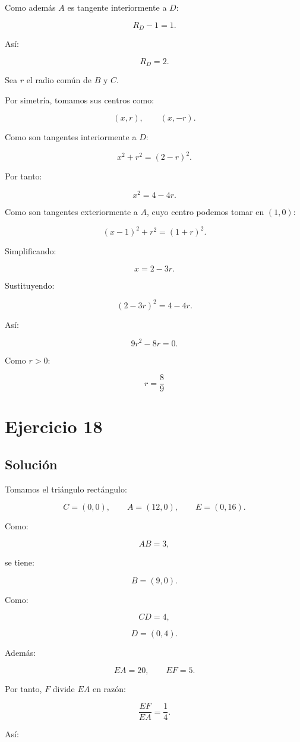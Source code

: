 \documentclass[11pt,a4paper]{article}
\begin{document}
Como además \(A\) es tangente interiormente a \(D\):

\[
R_D-1=1.
\]

Así:

\[
R_D=2.
\]

Sea \(r\) el radio común de \(B\) y \(C\).

Por simetría, tomamos sus centros como:

\[
(x,r),
\qquad
(x,-r).
\]

Como son tangentes interiormente a \(D\):

\[
x^2+r^2=(2-r)^2.
\]

Por tanto:

\[
x^2=4-4r.
\]

Como son tangentes exteriormente a \(A\), cuyo centro podemos tomar en \((1,0)\):

\[
(x-1)^2+r^2=(1+r)^2.
\]

Simplificando:

\[
x=2-3r.
\]

Sustituyendo:

\[
(2-3r)^2=4-4r.
\]

Así:

\[
9r^2-8r=0.
\]

Como \(r>0\):

\[
\boxed{
r=\frac89
}
\]

\section{Ejercicio 18}
\subsection{Solución}

Tomamos el triángulo rectángulo:

\[
C=(0,0),
\qquad
A=(12,0),
\qquad
E=(0,16).
\]

Como:

\[
AB=3,
\]

se tiene:

\[
B=(9,0).
\]

Como:

\[
CD=4,
\]

\[
D=(0,4).
\]

Además:

\[
EA=20,
\qquad
EF=5.
\]

Por tanto, \(F\) divide \(EA\) en razón:

\[
\frac{EF}{EA}=\frac14.
\]

Así:
\end{document}
